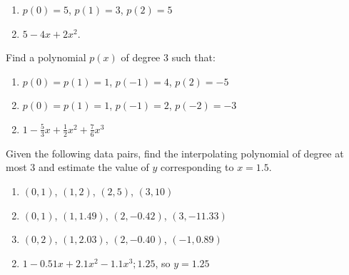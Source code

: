 \begin{multicols}{2}
\begin{ex}
\begin{enumerate}[label={\alph*.}]
\item $p(0) = 5$, $p(1) = 3$, $p(2) = 5$

\end{enumerate}
\begin{sol}
\begin{enumerate}[label={\alph*.}]
\setcounter{enumi}{1}
\item  $5 - 4x + 2x^{2}$.

\end{enumerate}
\end{sol}
\end{ex}

\begin{ex}
Find a polynomial $p(x)$ of degree $3$ such that:


\begin{enumerate}[label={\alph*.}]
\item $p(0) = p(1) = 1$, $p(-1) = 4$, $p(2) = -5$

\item $p(0) = p(1) = 1$, $p(-1) = 2$, $p(-2) = -3$

\end{enumerate}
\begin{sol}
\begin{enumerate}[label={\alph*.}]
\setcounter{enumi}{1}
\item  $ 1- \frac{5}{3}x  + \frac{1}{2} x ^2 + \frac{7}{6}x^3$

\end{enumerate}
\end{sol}
\end{ex}

\begin{ex}
Given the following data pairs, find the interpolating polynomial of degree at most $3$ and estimate the value of $y$ corresponding to $x = 1.5$.


\begin{enumerate}[label={\alph*.}]
\item $(0, 1)$, $(1, 2)$, $(2, 5)$, $(3, 10)$

\item $(0, 1)$, $(1, 1.49)$, $(2, -0.42)$, $(3, -11.33)$

\item $(0, 2)$, $(1, 2.03)$, $(2, -0.40)$, $(-1, 0.89)$

\end{enumerate}
\begin{sol}
\begin{enumerate}[label={\alph*.}]
\setcounter{enumi}{1}
\item  $1 - 0.51 x + 2.1 x^2 - 1.1 x^3; 1.25$, so  $y = 1.25$



\end{enumerate}
\end{sol}
\end{ex}
\end{multicols}
